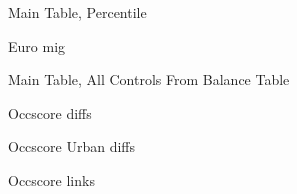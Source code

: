 \documentclass{article}
\begin{document}
\clearpage
\begin{table}
\footnotesize
\centering
\caption{Main Table, Percentile}
\begin{threeparttable}
\footnotesize

\end{threeparttable}
\label{tab:log_effect}
\end{table}
\clearpage



\begin{table}
\footnotesize
\centering
\caption{Euro mig}
\begin{threeparttable}
\footnotesize

\end{threeparttable}
\label{tab:mig_new}
\end{table}
\clearpage


\clearpage
\begin{table}
\footnotesize
\centering
\caption{Main Table, All Controls From Balance Table}
\begin{threeparttable}
\footnotesize

\end{threeparttable}
\label{tab:log_effect}
\end{table}
\clearpage



\clearpage
\begin{table}
\footnotesize
\centering
\caption{Occscore diffs}
\begin{threeparttable}
\footnotesize

\end{threeparttable}
\label{tab:log_effect}
\end{table}
\clearpage

\clearpage
\begin{table}
\footnotesize
\centering
\caption{Occscore Urban diffs}
\begin{threeparttable}
\footnotesize

\end{threeparttable}
\label{tab:log_effect}
\end{table}
\clearpage

\clearpage
\begin{table}
\footnotesize
\centering
\caption{Occscore links}
\begin{threeparttable}
\footnotesize

\end{threeparttable}
\label{tab:log_effect}
\end{table}
\clearpage
\end{document}
